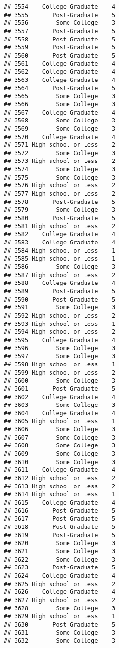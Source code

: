 \documentclass[
]{article}
\begin{document}
\begin{verbatim}
## 3554    College Graduate    4
## 3555       Post-Graduate    5
## 3556        Some College    3
## 3557       Post-Graduate    5
## 3558       Post-Graduate    5
## 3559       Post-Graduate    5
## 3560       Post-Graduate    5
## 3561    College Graduate    4
## 3562    College Graduate    4
## 3563    College Graduate    4
## 3564       Post-Graduate    5
## 3565        Some College    3
## 3566        Some College    3
## 3567    College Graduate    4
## 3568        Some College    3
## 3569        Some College    3
## 3570    College Graduate    4
## 3571 High school or Less    2
## 3572        Some College    3
## 3573 High school or Less    2
## 3574        Some College    3
## 3575        Some College    3
## 3576 High school or Less    2
## 3577 High school or Less    2
## 3578       Post-Graduate    5
## 3579        Some College    3
## 3580       Post-Graduate    5
## 3581 High school or Less    2
## 3582    College Graduate    4
## 3583    College Graduate    4
## 3584 High school or Less    1
## 3585 High school or Less    1
## 3586        Some College    3
## 3587 High school or Less    2
## 3588    College Graduate    4
## 3589       Post-Graduate    5
## 3590       Post-Graduate    5
## 3591        Some College    3
## 3592 High school or Less    2
## 3593 High school or Less    1
## 3594 High school or Less    2
## 3595    College Graduate    4
## 3596        Some College    3
## 3597        Some College    3
## 3598 High school or Less    1
## 3599 High school or Less    2
## 3600        Some College    3
## 3601       Post-Graduate    5
## 3602    College Graduate    4
## 3603        Some College    3
## 3604    College Graduate    4
## 3605 High school or Less    1
## 3606        Some College    3
## 3607        Some College    3
## 3608        Some College    3
## 3609        Some College    3
## 3610        Some College    3
## 3611    College Graduate    4
## 3612 High school or Less    2
## 3613 High school or Less    2
## 3614 High school or Less    1
## 3615    College Graduate    4
## 3616       Post-Graduate    5
## 3617       Post-Graduate    5
## 3618       Post-Graduate    5
## 3619       Post-Graduate    5
## 3620        Some College    3
## 3621        Some College    3
## 3622        Some College    3
## 3623       Post-Graduate    5
## 3624    College Graduate    4
## 3625 High school or Less    2
## 3626    College Graduate    4
## 3627 High school or Less    2
## 3628        Some College    3
## 3629 High school or Less    1
## 3630       Post-Graduate    5
## 3631        Some College    3
## 3632        Some College    3

\end{verbatim}
\end{document}
